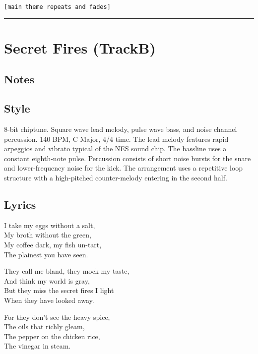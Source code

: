\texttt{{[}main\ theme\ repeats\ and\ fades{]}}

\begin{center}\rule{0.5\linewidth}{0.5pt}\end{center}

\section{Secret Fires (TrackB)}\label{secret-fires-trackb}

\subsection{Notes}\label{notes-31}

\subsection{Style}\label{style-30}

8-bit chiptune. Square wave lead melody, pulse wave bass, and noise
channel percussion. 140 BPM, C Major, 4/4 time. The lead melody features
rapid arpeggios and vibrato typical of the NES sound chip. The bassline
uses a constant eighth-note pulse. Percussion consists of short noise
bursts for the snare and lower-frequency noise for the kick. The
arrangement uses a repetitive loop structure with a high-pitched
counter-melody entering in the second half.

\subsection{Lyrics}\label{lyrics-30}

I take my eggs without a salt,\\
My broth without the green,\\
My coffee dark, my fish un-tart,\\
The plainest you have seen.

They call me bland, they mock my taste,\\
And think my world is gray,\\
But they miss the secret fires I light\\
When they have looked away.

For they don't see the heavy spice,\\
The oils that richly gleam,\\
The pepper on the chicken rice,\\
The vinegar in steam.

